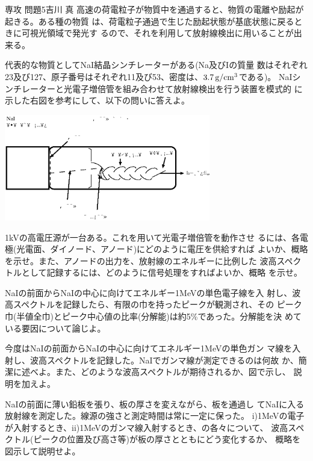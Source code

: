 \documentclass[fleqn]{jbook}
\begin{document}
\begin{question}{専攻 問題5}{吉川 真}
高速の荷電粒子が物質中を通過すると、物質の電離や励起が起きる。ある種の物質
 は、荷電粒子通過で生じた励起状態が基底状態に戻るときに可視光領域で発光す
 るので、それを利用して放射線検出に用いることが出来る。
\parbox{6.5cm}{
 \hspace*{1em}代表的な物質としてNaI結晶シンチレーターがある(Na及びIの質量
 数はそれぞれ
 23及び127、原子番号はそれぞれ11及び53、密度は、$3.7\,{\rm g/cm^3}$である)。
 NaIシンチレーターと光電子増倍管を組み合わせて放射線検出を行う装置を模式的
 に示した右図を参考にして、以下の問いに答えよ。
 }
 \parbox{10cm}{
 \begin{center}
  \includegraphics[width=9cm,keepaspectratio,clip]{1999phy5-1.eps}
 \end{center}
 }

\begin{subquestions}
 \SubQuestion 1kVの高電圧源が一台ある。これを用いて光電子増倍管を動作させ
 るには、各電極(光電面、ダイノード、アノード)にどのように電圧を供給すれば
 よいか、概略を示せ。また、アノードの出力を、放射線のエネルギーに比例した
 波高スペクトルとして記録するには、どのように信号処理をすればよいか、概略
 を示せ。

 \SubQuestion NaIの前面からNaIの中心に向けてエネルギー1MeVの単色電子線を入
 射し、波高スペクトルを記録したら、有限の巾を持ったピークが観測され、その
 ピーク巾(半値全巾)とピーク中心値の比率(分解能)は約5\%であった。分解能を決
 めている要因について論じよ。
 
 \SubQuestion 今度はNaIの前面からNaIの中心に向けてエネルギー1MeVの単色ガン
 マ線を入射し、波高スペクトルを記録した。NaIでガンマ線が測定できるのは何故
 か、簡潔に述べよ。また、どのような波高スペクトルが期待されるか、図で示し、
 説明を加えよ。

 \SubQuestion NaIの前面に薄い鉛板を張り、板の厚さを変えながら、板を通過し
 てNaIに入る放射線を測定した。線源の強さと測定時間は常に一定に保った。
 i)1MeVの電子が入射するとき、ii)1MeVのガンマ線入射するとき、の各々について、
 波高スペクトル(ピークの位置及び高さ等)が板の厚さとともにどう変化するか、
 概略を図示して説明せよ。


\end{subquestions}
\end{question}
\end{document}
